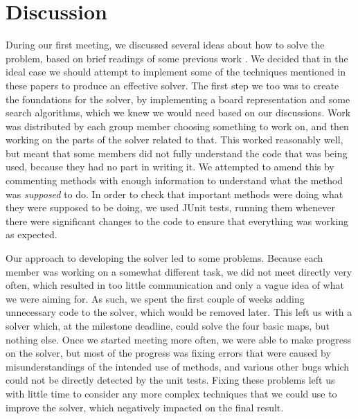 \documentclass[a4paper,11pt]{article}
\begin{document}
\section{Discussion}
During our first meeting, we discussed several ideas about how to solve the
problem, based on brief readings of some previous work \cite{virkkala, jung}. We
decided that in the ideal case we should attempt to implement some of the
techniques mentioned in these papers to produce an effective solver. The first
step we too was to create the foundations for the solver, by implementing a
board representation and some search algorithms, which we knew we would need
based on our discussions. Work was distributed by each group member choosing
something to work on, and then working on the parts of the solver related to
that. This worked reasonably well, but meant that some members did not fully
understand the code that was being used, because they had no part in writing
it. We attempted to amend this by commenting methods with enough information to
understand what the method was \emph{supposed} to do. In order to check that
important methods were doing what they were supposed to be doing, we used JUnit
tests, running them whenever there were significant changes to the code to
ensure that everything was working as expected.

Our approach to developing the solver led to some problems. Because each member
was working on a somewhat different task, we did not meet directly very often,
which resulted in too little communication and only a vague idea of what we were
aiming for. As such, we spent the first couple of weeks adding unnecessary code
to the solver, which would be removed later. This left us with a solver which,
at the milestone deadline, could solve the four basic maps, but nothing
else. Once we started meeting more often, we were able to make progress on the
solver, but most of the progress was fixing errors that were caused by
misunderstandings of the intended use of methods, and various other bugs which
could not be directly detected by the unit tests. Fixing these problems left us
with little time to consider any more complex techniques that we could use to
improve the solver, which negatively impacted on the final result.
\end{document}
